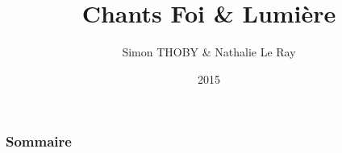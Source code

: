 \documentclass{beamer}
\title{Chants Foi \& Lumière}
\author{Simon THOBY \& Nathalie Le Ray}
\date{2015}
\begin{document}
 
\frame{\titlepage}
 
\begin{frame}
\frametitle{Sommaire}  
\tableofcontents  
\end{frame}


 
\end{document}
